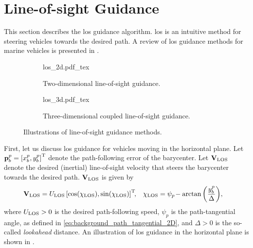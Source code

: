 \section{Line-of-sight Guidance}
\label{sec:background_LOS}

This section describes the \gls{los} guidance algorithm.
\gls{los} is an intuitive method for steering vehicles towards the desired path.
A review of \gls{los} guidance methods for marine vehicles is presented in \cite{gu_LOS_2023}.

\begin{figure}[b]
    \centering
    \begin{subfigure}{0.48\textwidth}
        \centering
        \def\svgwidth{0.9\textwidth}
        {los_2d.pdf_tex}
        \caption{Two-dimensional line-of-sight guidance.}
        \label{fig:background_los_2d}
    \end{subfigure}
    \begin{subfigure}{0.48\textwidth}
        \def\svgwidth{\textwidth}
        {los_3d.pdf_tex}
        \caption{Three-dimensional coupled line-of-sight guidance.}
        \label{fig:background_los_3d}
    \end{subfigure}
    \caption{Illustrations of line-of-sight guidance methods.}
\end{figure}

First, let us discuss \gls{los} guidance for vehicles moving in the horizontal plane.
Let $\mathbf{p}_b^p = \left[x_b^p, y_b^p\right]^{\mathrm{T}}$ denote the path-following error of the barycenter.
Let $\mathbf{V}_{\rm LOS}$ denote the desired (inertial) line-of-sight velocity that steers the barycenter towards the desired path.
$\mathbf{V}_{\rm LOS}$ is given by \cite{fossen_handbook_2011,pettersen_waypoint_2001}
\begin{align}
    \mathbf{V}_{\rm LOS} &= U_{\rm LOS} \left[\cos(\chi_{\rm LOS}), \sin(\chi_{\rm LOS})\right]^{\mathrm{T}}\!\!, &
    \chi_{\rm LOS} &= \psi_{p\!} - \arctan\left(\frac{y_b^p}{\Delta}\right)\!,
    \label{eq:background_los_2d}
\end{align}
where $U_{\rm LOS} > 0$ is the desired path-following speed, $\psi_p$ is the path-tangential angle, as defined in \eqref{eq:background_path_tangential_2D}, and $\Delta > 0$ is the so-called \emph{lookahead} distance.
An illustration of \gls{los} guidance in the horizontal plane is shown in .

